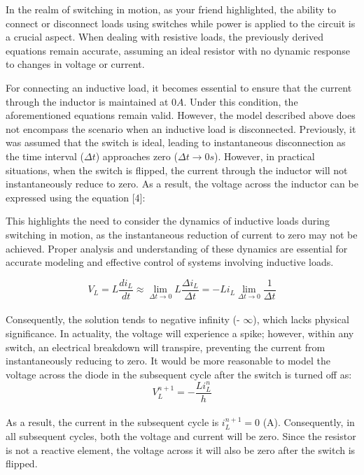In the realm of switching in motion, as your friend highlighted, the ability to connect or disconnect loads using switches while power is applied to the circuit is a crucial aspect. When dealing with resistive loads, the previously derived equations remain accurate, assuming an ideal resistor with no dynamic response to changes in voltage or current.

For connecting an inductive load, it becomes essential to ensure that the current through the inductor is maintained at $0A$. Under this condition, the aforementioned equations remain valid. However, the model described above does not encompass the scenario when an inductive load is disconnected. Previously, it was assumed that the switch is ideal, leading to instantaneous disconnection as the time interval ($\Delta t$) approaches zero ($\Delta t \to 0s$). However, in practical situations, when the switch is flipped, the current through the inductor will not instantaneously reduce to zero. As a result, the voltage across the inductor can be expressed using the equation [4]:

This highlights the need to consider the dynamics of inductive loads during switching in motion, as the instantaneous reduction of current to zero may not be achieved. Proper analysis and understanding of these dynamics are essential for accurate modeling and effective control of systems involving inductive loads.

\begin{equation}
    V_L=L\frac{di_L}{dt} \approx \lim_{\Delta t \to 0} L\frac{\Delta i_L}{\Delta t}=-Li_L \lim_{\Delta t \to 0} \frac{1}{\Delta t}
\end{equation}\\

Consequently, the solution tends to negative infinity (- $\infty$), which lacks physical significance. In actuality, the voltage will experience a spike; however, within any switch, an electrical breakdown will transpire, preventing the current from instantaneously reducing to zero. It would be more reasonable to model the voltage across the diode in the subsequent cycle after the switch is turned off as:\\

\begin{equation}
    V^{n+1}_L = -\frac{Li^{n}_L}{h}
\end{equation}\\

As a result, the current in the subsequent cycle is $i_L^{n+1} = 0$ (A). Consequently, in all subsequent cycles, both the voltage and current will be zero. Since the resistor is not a reactive element, the voltage across it will also be zero after the switch is flipped.

